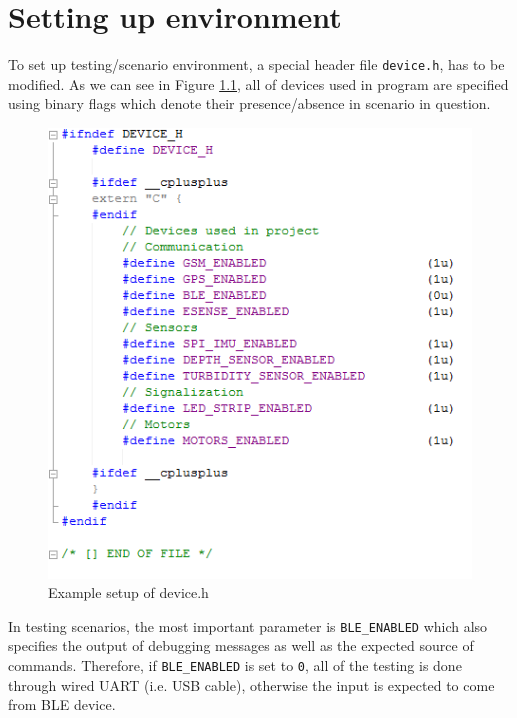 \chapter{Setting up environment}
\label{ch:env_setup}

To set up testing/scenario environment, a special header file \texttt{device.h}, has to be modified. As we can see in Figure \ref{fig:device_h}, all of devices used in program are specified using binary flags which denote their presence/absence in scenario in question.

\begin{figure}[htb]
    \centering
	  \includegraphics[width=0.7\linewidth]{figures/Environment_setup.PNG}
	\caption{Example setup of device.h}
	\label{fig:device_h}
\end{figure}

In testing scenarios, the most important parameter is \texttt{BLE\_ENABLED} which also specifies the output of debugging messages as well as the expected source of commands. Therefore, if \texttt{BLE\_ENABLED} is set to \texttt{0}, all of the testing is done through wired UART (i.e. USB cable), otherwise the input is expected to come from BLE device.